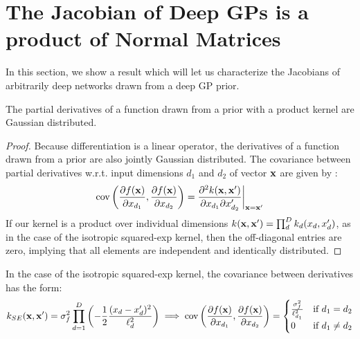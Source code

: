 \documentclass{article}
\begin{document}
\section{The Jacobian of Deep GPs is a product of \iid{} Normal Matrices}

In this section, we show a result which will let us characterize the Jacobians of arbitrarily deep networks drawn from a deep GP prior.

\begin{lemma}
The partial derivatives of a function drawn from a \gp{} prior with a product kernel are \iid Gaussian distributed.
\end{lemma}
%
\begin{proof}
Because differentiation is a linear operator, the derivatives of a function drawn from a \gp{} prior are also jointly Gaussian distributed.  The covariance between partial derivatives w.r.t. input dimensions $d_1$ and $d_2$ of vector ${\bf{x}}$ are given by \citep{Solak03derivativeobservations}:
%
\begin{align}
\operatorname{cov} \left( \frac{\partial f({\bf{x}})}{\partial x_{d_1}}, \frac{\partial f({\bf{x}})}{\partial x_{d_2}} \right) 
= \frac{\partial^2 k({\bf{x}}, {\bf{x}}')}{\partial x_{d_1} \partial x_{d_2}'} \bigg|_{{\bf{x}}={\bf{x}}'}
\end{align}
%
If our kernel is a product over individual dimensions $k({\bf{x}}, {\bf{x}}') = \prod_d^D k_d(x_d, x_d')$, as in the case of the isotropic squared-exp kernel, then the off-diagonal entries are zero, implying that all elements are independent and identically distributed.
\end{proof}

In the case of the isotropic squared-exp kernel, the covariance between derivatives has the form:
\begin{align}
k_{SE}({\bf{x}}, {\bf{x}}') = \sigma^2_f \prod_{d=1}^D \left(-\frac{1}{2} \frac{(x_d - x_d')^2}{\ell_d^2} \right) \implies 
\operatorname{cov} \left( \frac{\partial f({\bf{x}})}{\partial x_{d_1}}, \frac{\partial f({\bf{x}})}{\partial x_{d_2}} \right) =
\begin{cases} 
\frac{\sigma^2_f}{\ell_{d_1}^2} & \mbox{if } d_1 = d_2 \\ 
0 & \mbox{if } d_1 \neq d_2 \end{cases}
\end{align}
\end{document}
